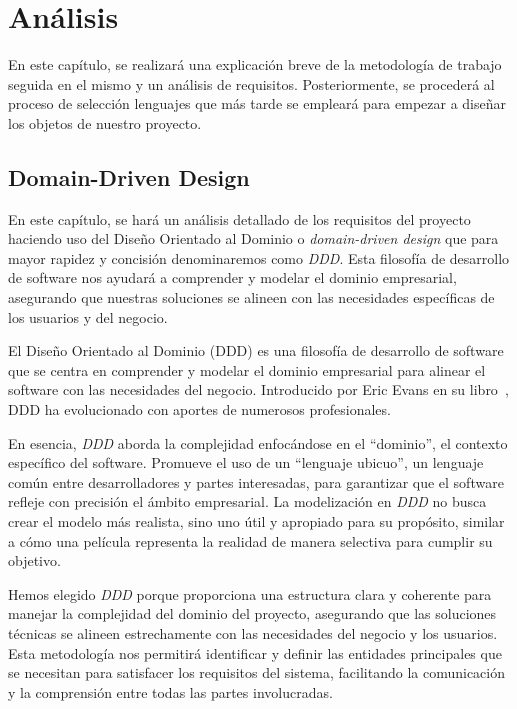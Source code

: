 \chapter{Análisis}

En este capítulo, se realizará una explicación breve de la metodología de trabajo seguida en el mismo y un análisis de requisitos. Posteriormente, se procederá al proceso de selección lenguajes que más tarde se empleará para empezar a diseñar los objetos de nuestro proyecto.

\section{Domain-Driven Design}

En este capítulo, se hará un análisis detallado de los requisitos del proyecto haciendo uso del Diseño Orientado al Dominio o \textit{domain-driven design} que para mayor rapidez y concisión denominaremos como \textit{DDD}. Esta filosofía de desarrollo de software nos ayudará a comprender y modelar el dominio empresarial, asegurando que nuestras soluciones se alineen con las necesidades específicas de los usuarios y del negocio.

El Diseño Orientado al Dominio (DDD) es una filosofía de desarrollo de software que se centra en comprender y modelar el dominio empresarial para alinear el software con las necesidades del negocio. Introducido por Eric Evans en su libro~\cite{evans2004domain}, DDD ha evolucionado con aportes de numerosos profesionales.

En esencia, \textit{DDD} aborda la complejidad enfocándose en el ``dominio'', el contexto específico del software. Promueve el uso de un ``lenguaje ubicuo'', un lenguaje común entre desarrolladores y partes interesadas, para garantizar que el software refleje con precisión el ámbito empresarial. La modelización en \textit{DDD} no busca crear el modelo más realista, sino uno útil y apropiado para su propósito, similar a cómo una película representa la realidad de manera selectiva para cumplir su objetivo.

Hemos elegido \textit{DDD} porque proporciona una estructura clara y coherente para manejar la complejidad del dominio del proyecto, asegurando que las soluciones técnicas se alineen estrechamente con las necesidades del negocio y los usuarios. Esta metodología nos permitirá identificar y definir las entidades principales que se necesitan para satisfacer los requisitos del sistema, facilitando la comunicación y la comprensión entre todas las partes involucradas.

